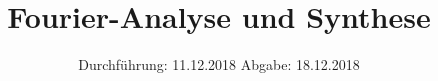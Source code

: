 

\subject{V351}
\title{Fourier-Analyse und Synthese}
\date{%
  Durchführung: 11.12.2018
  \hspace{3em}
  Abgabe: 18.12.2018
}



\maketitle
\thispagestyle{empty}
\tableofcontents
\newpage






\printbibliography{}


